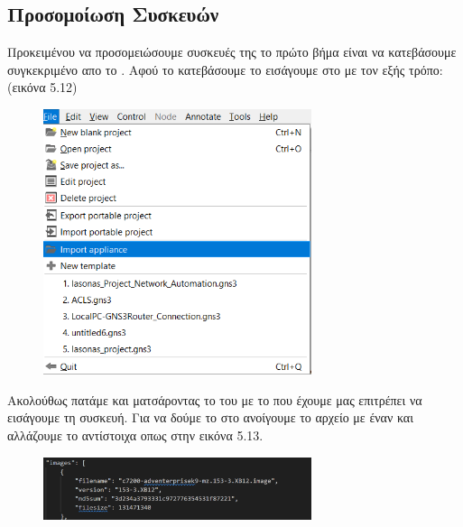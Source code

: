 \FloatBarrier





\subsection{Προσομοίωση Συσκευών }

Προκειμένου να προσομειώσουμε συσκευές της  το πρώτο βήμα είναι να κατεβάσουμε συγκεκριμένο  απο το . Αφού το κατεβάσουμε το εισάγουμε στο  με τον εξής τρόπο: (εικόνα 5.12)

\FloatBarrier

\begin{figure}[htb]
	\centering
	\includegraphics[width=0.7\textwidth]{graphics/import_appliance.png}
	\caption{ }
\end{figure}

\FloatBarrier

Ακολούθως πατάμε  και ματσάροντας το  του  με το  που έχουμε μας επιτρέπει να εισάγουμε τη συσκευή. Για να δούμε το  στο  ανοίγουμε το αρχείο με έναν  και αλλάζουμε το  αντίστοιχα οπως στην  εικόνα 5.13.

\FloatBarrier

\begin{figure}[htb]
	\centering
	\includegraphics[width=0.7\textwidth]{graphics/appliance_filename.png}
	\caption{ }
\end{figure}


